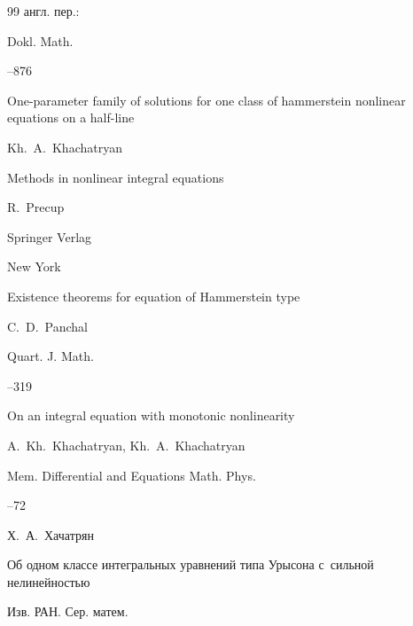 \begin{thebibliography}{99}
\transl англ. пер.:~

\jour Dokl. Math.




--876

\paper One-parameter family of solutions for one class of hammerstein nonlinear equations on a half-line

\by  Kh.~A.~Khachatryan




\book Methods in nonlinear integral equations

\by  R.~Precup

\publ Springer Verlag

\publaddr New York






\paper Existence theorems for equation of Hammerstein type

\by    C.~D.~Panchal

\jour Quart. J. Math.




--319




\paper On an integral equation with monotonic nonlinearity

\by   A.~Kh.~Khachatryan, Kh.~A.~Khachatryan

\jour Mem. Differential and Equations Math. Phys.



--72




\by    Х.~А.~Хачатрян

\paper Об одном классе интегральных уравнений типа Урысона с~сильной нелинейностью

\jour Изв. РАН. Сер. матем.




\end{thebibliography}
